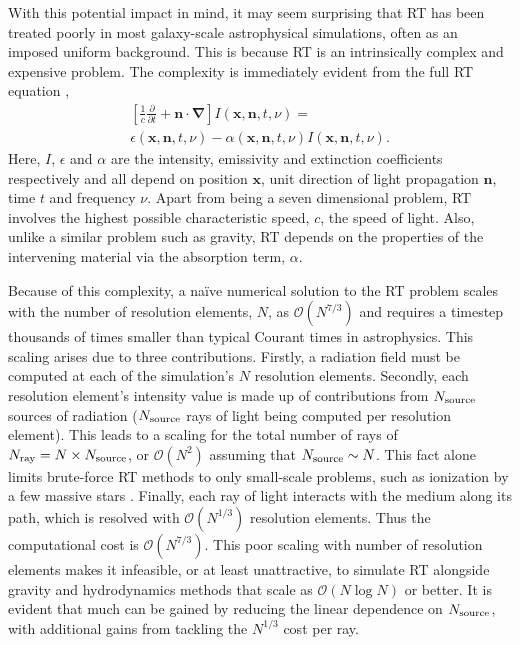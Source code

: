 \documentclass[fleq,usenatbib]{mnras}
\newcommand{\bigO}[1]{\mathcal{O}\left(#1\right)}
\newcommand{\NS}{N_{\rm source}}
\newcommand{\NR}{N_{\rm ray}}
\begin{document}
With this potential impact in mind, it may seem surprising that RT has been 
treated poorly in most galaxy-scale astrophysical simulations, often as an 
imposed uniform background. This is because RT is an intrinsically complex and 
expensive problem. The complexity is immediately evident from the 
full RT equation 
\citep[e.g.][]{mihalasMihalas84},
\begin{eqnarray} \label{eqn:classicrt}
\left[ \frac{1}{c} \frac{\partial}{\partial t} + \mathbf{n \cdot \nabla}
 \right] I\left(\mathbf{x}, \mathbf{n}, t, \nu\right) = \nonumber \\
\epsilon\left(\mathbf{x}, \mathbf{n}, t, \nu\right) - 
\alpha\left(\mathbf{x}, \mathbf{n}, t, \nu\right) 
I\left(\mathbf{x}, \mathbf{n}, t, \nu\right).
\end{eqnarray} 
Here, $I$, $\epsilon$ and $\alpha$ are the intensity, emissivity and 
extinction coefficients respectively and all depend on position $\mathbf{x}$, 
unit direction of light propagation $\mathbf{n}$, time $t$ and frequency 
$\nu$. Apart from being a seven dimensional problem, RT involves the highest 
possible characteristic speed, $c$, the speed of light. Also, unlike a similar
problem such as gravity, RT depends on the properties of the 
intervening material via the absorption term, $\alpha$.

Because of this complexity, a na\"ive numerical solution to the RT problem 
scales with the number of resolution elements, $N$, as $\bigO{N^{7/3}}$ and 
requires a timestep thousands of times smaller than typical Courant times in 
astrophysics. This scaling arises due to three contributions. Firstly, a 
radiation field must be computed at each of the simulation's $N$ resolution 
elements. Secondly, each resolution element's intensity value is made up of 
contributions from $\NS$ sources of radiation ($\NS$ rays of light being 
computed per resolution element). This leads to a scaling for the total number 
of rays of $\NR = N \times \NS$, or $\bigO{N^2}$ assuming that $\NS \sim N$. 
This fact alone limits brute-force RT methods to only small-scale problems, 
such as ionization by a few massive stars \citep[e.g.][]{howard16, 
howard17}. Finally, each ray of light interacts with the medium along its 
path, which is resolved with $\bigO{N^{1/3}}$ resolution elements. Thus the 
computational cost is $\bigO{N^{7/3}}$. This poor scaling with number of 
resolution elements makes it infeasible, or at least unattractive, to simulate 
RT alongside gravity and hydrodynamics methods that scale as $\bigO{N\log N}$ 
or better. It is evident that much can be gained by reducing the linear 
dependence on $\NS$, with additional gains from tackling the $N^{1/3}$ cost 
per ray.
\end{document}
